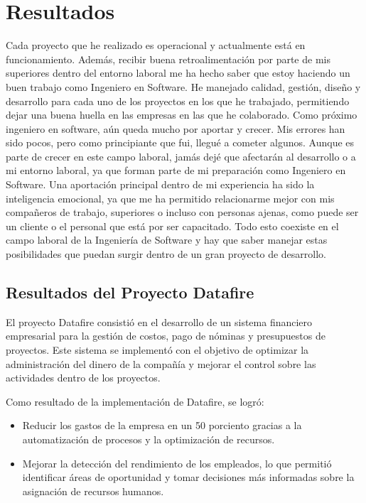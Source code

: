 \documentclass[protocolo.tex]{subfiles}
\begin{document}
\section{Resultados}
Cada proyecto que he realizado es operacional y actualmente está en funcionamiento.
Además, recibir buena retroalimentación por parte de mis superiores dentro del entorno
laboral me ha hecho saber que estoy haciendo un buen trabajo como Ingeniero en Software.
He manejado calidad, gestión, diseño y desarrollo para cada uno de los proyectos en los que
he trabajado, permitiendo dejar una buena huella en las empresas en las que he colaborado.
Como próximo ingeniero en software, aún queda mucho por aportar y crecer.
Mis errores han sido pocos, pero como principiante que fui, llegué a cometer algunos.
Aunque es parte de crecer en este campo laboral, jamás dejé que afectarán al desarrollo o a
mi entorno laboral, ya que forman parte de mi preparación como Ingeniero en Software.
Una aportación principal dentro de mi experiencia ha sido la inteligencia emocional, ya que
me ha permitido relacionarme mejor con mis compañeros de trabajo, superiores o incluso
con personas ajenas, como puede ser un cliente o el personal que está por ser capacitado.
Todo esto coexiste en el campo laboral de la Ingeniería de Software y hay que saber
manejar estas posibilidades que puedan surgir dentro de un gran proyecto de desarrollo.

\subsection{Resultados del Proyecto Datafire}

El proyecto Datafire consistió en el desarrollo de un sistema financiero empresarial para la gestión de costos, pago de nóminas y presupuestos de proyectos. Este sistema se implementó con el objetivo de optimizar la administración del dinero de la compañía y mejorar el control sobre las actividades dentro de los proyectos.

Como resultado de la implementación de Datafire, se logró:

\begin{itemize}
\item Reducir los gastos de la empresa en un 50 porciento gracias a la automatización de procesos y la optimización de recursos.
\item Mejorar la detección del rendimiento de los empleados, lo que permitió identificar áreas de oportunidad y tomar decisiones más informadas sobre la asignación de recursos humanos.
\end{itemize}
\end{document}
